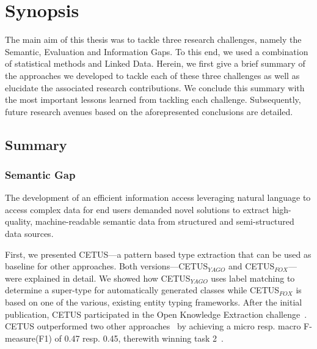 \chapter{Synopsis}





The main aim of this thesis was to tackle three research challenges, namely the Semantic, Evaluation and Information Gaps. To this end, we used a combination of statistical methods and Linked Data. Herein, we first give a brief summary of the approaches we developed to tackle each of these three challenges as well as elucidate the associated research contributions. We conclude this summary with the most important lessons learned from tackling each challenge.
Subsequently, future research avenues based on the aforepresented conclusions are detailed.
 
\section{Summary}
\subsection*{Semantic Gap}

The development of an efficient information access leveraging natural language to access complex data for end users demanded novel solutions to extract high-quality, machine-readable semantic data from structured and semi-structured data sources.

First, we presented CETUS---a pattern based type extraction that can be used as baseline for other approaches.
Both versions---CETUS$_{YAGO}$ and CETUS$_{FOX}$---were explained in detail.
We showed how CETUS$_{YAGO}$ uses label matching to determine a super-type for automatically generated classes while CETUS$_{FOX}$ is based on one of the various, existing entity typing frameworks.
After the initial publication, CETUS participated in the Open Knowledge Extraction challenge~\cite{okechallenge}.
CETUS outperformed two other approaches~\cite{fred_typing,oak_sheffield} by achieving a  micro resp. macro F-measure(F1) of 0.47 resp. 0.45, therewith winning task 2~\cite{okechallenge}.	

